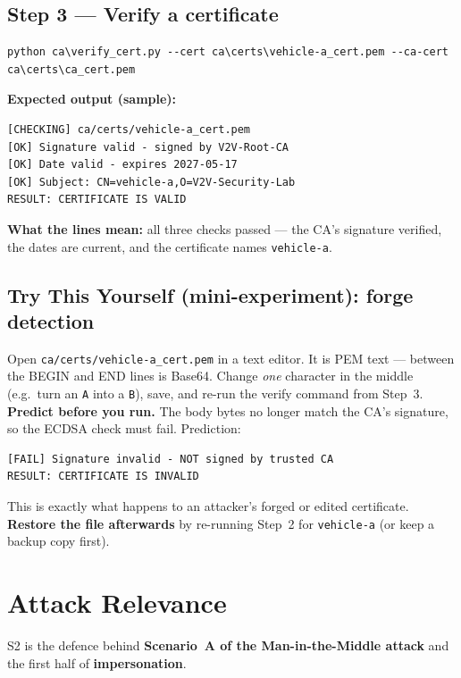 \documentclass[11pt,a4paper]{article}
\begin{document}
\subsection{Step 3 --- Verify a certificate}
\begin{lstlisting}[style=term]
python ca\verify_cert.py --cert ca\certs\vehicle-a_cert.pem --ca-cert ca\certs\ca_cert.pem
\end{lstlisting}
\textbf{Expected output (sample):}
\begin{lstlisting}[style=term]
[CHECKING] ca/certs/vehicle-a_cert.pem
[OK] Signature valid - signed by V2V-Root-CA
[OK] Date valid - expires 2027-05-17
[OK] Subject: CN=vehicle-a,O=V2V-Security-Lab
RESULT: CERTIFICATE IS VALID
\end{lstlisting}
\textbf{What the lines mean:} all three checks passed --- the CA's signature
verified, the dates are current, and the certificate names \texttt{vehicle-a}.

\subsection{Try This Yourself (mini-experiment): forge detection}
Open \texttt{ca/certs/vehicle-a\_cert.pem} in a text editor. It is PEM text ---
between the BEGIN and END lines is Base64. Change \emph{one} character in the
middle (e.g.\ turn an \texttt{A} into a \texttt{B}), save, and re-run the verify
command from Step~3.\\
\textbf{Predict before you run.} The body bytes no longer match the CA's
signature, so the ECDSA check must fail. Prediction:
\begin{lstlisting}[style=term]
[FAIL] Signature invalid - NOT signed by trusted CA
RESULT: CERTIFICATE IS INVALID
\end{lstlisting}
This is exactly what happens to an attacker's forged or edited certificate.
\textbf{Restore the file afterwards} by re-running Step~2 for \texttt{vehicle-a}
(or keep a backup copy first).

\section{Attack Relevance}

S2 is the defence behind \textbf{Scenario~A of the Man-in-the-Middle attack} and
the first half of \textbf{impersonation}.
\end{document}
